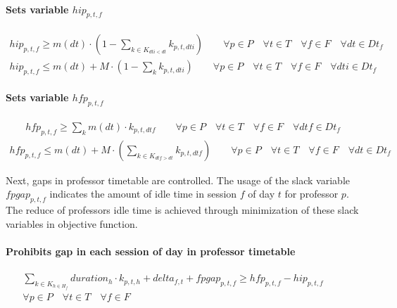 \paragraph{Sets variable $hip_{p,t,f}$}
\begin{eqnarray}
hip_{p,t,f} \geq m(dt) \cdot ( 1 - \sum\limits_{k \in K_{dti<dt}} k_{p,t,dti} ) \nonumber \qquad
\forall p \in P \quad
\forall t \in T \quad
\forall f \in F \quad
\forall dt \in Dt_{f}
\end{eqnarray}
\begin{eqnarray}
hip_{p,t,f} \leq m(dt) + M \cdot ( 1 - \sum\limits_{k} k_{p,t,dti} ) \nonumber \qquad
\forall p \in P \quad
\forall t \in T \quad
\forall f \in F \quad
\forall dti \in Dt_{f}
\end{eqnarray}

\paragraph{Sets variable $hfp_{p,t,f}$}
\begin{eqnarray}
hfp_{p,t,f} \geq \sum\limits_{k} m(dt) \cdot k_{p,t,dtf} \nonumber \qquad
\forall p \in P \quad
\forall t \in T \quad
\forall f \in F \quad
\forall dtf \in Dt_{f}
\end{eqnarray}
\begin{eqnarray}
hfp_{p,t,f} \leq m(dt) + M \cdot ( \sum\limits_{k \in K_{dtf>dt}} k_{p,t,dtf} ) \nonumber \qquad
\forall p \in P \quad
\forall t \in T \quad
\forall f \in F \quad
\forall dt \in Dt_{f}
\end{eqnarray}

Next, gaps in professor timetable are controlled. The usage of the slack variable $fpgap_{p,t,f}$ indicates the amount of idle time in session $f$ of day $t$ for professor $p$. The reduce of professors idle time is achieved through minimization of these slack variables in objective function.

\paragraph{Prohibits gap in each session of day in professor timetable}
\begin{eqnarray}
\sum\limits_{k \in K_{h \in H_{f}}} duration_{h} \cdot k_{p,t,h} + delta_{f,t} + fpgap_{p,t,f} \geq hfp_{p,t,f} - hip_{p,t,f} \nonumber \qquad
\\
\forall p \in P \quad
\forall t \in T \quad
\forall f \in F \quad
\end{eqnarray}


